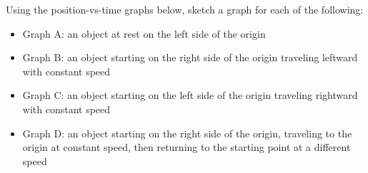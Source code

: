 \documentclass[]{exam}
\begin{document}
\begin{questions}
\question 
{} 




\question
Using the position-vs-time graphs below, sketch a graph for each of the following:

\begin{itemize}
    \item Graph A: an object at rest on the left side of the origin
    \item Graph B: an object starting on the right side of the origin traveling leftward with constant speed
    \item Graph C: an object starting on the left side of the origin traveling rightward with constant speed
    \item Graph D: an object starting on the right side of the origin, traveling to the origin at constant speed, then returning to the starting point at a different speed
\end{itemize}


\end{questions}
\end{document}

